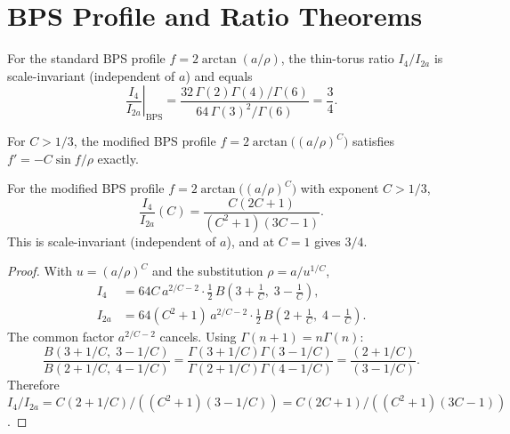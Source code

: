 

\section*{BPS Profile and Ratio Theorems}
\label{sec:bps}

\begin{proposition}
\label{P1:prop:bps}
For the standard BPS profile $f=2\arctan(a/\rho)$, the thin-torus ratio
$I_4/I_{2a}$ is scale-invariant (independent of $a$) and equals
\begin{equation}
  \left.\frac{I_4}{I_{2a}}\right|_{\mathrm{BPS}}
  = \frac{32\,\Gamma(2)\Gamma(4)/\Gamma(6)}
         {64\,\Gamma(3)^2/\Gamma(6)}
  = \frac{3}{4}.
  \label{P1:eq:bps_ratio}
\end{equation}
\end{proposition}

\begin{definition}
\label{P1:def:modified_bps}
For $C>1/3$, the modified BPS profile
$f = 2\arctan\!\bigl((a/\rho)^C\bigr)$
satisfies $f' = -C\sin f/\rho$ exactly.
\end{definition}

\begin{theorem}
\label{P1:thm:modBPS}
For the modified BPS profile $f = 2\arctan\!\bigl((a/\rho)^C\bigr)$
with exponent $C > 1/3$,
\begin{equation}
  \boxed{\frac{I_4}{I_{2a}}(C)
  = \frac{C(2C+1)}{(C^2+1)(3C-1)}.}
  \label{P1:eq:modBPS}
\end{equation}
This is scale-invariant (independent of $a$), and at $C=1$ gives $3/4$.
\end{theorem}
\begin{proof}
With $u=(a/\rho)^C$ and the substitution $\rho=a/u^{1/C}$,
\begin{align}
  I_4   &= 64C\,a^{2/C-2}\cdot\tfrac{1}{2}\,B\!\left(3+\tfrac{1}{C},\;3-\tfrac{1}{C}\right), \\
  I_{2a} &= 64(C^2+1)\,a^{2/C-2}\cdot\tfrac{1}{2}\,B\!\left(2+\tfrac{1}{C},\;4-\tfrac{1}{C}\right).
\end{align}
The common factor $a^{2/C-2}$ cancels.  Using $\Gamma(n+1)=n\Gamma(n)$:
\[
  \frac{B(3+1/C,\;3-1/C)}{B(2+1/C,\;4-1/C)}
  = \frac{\Gamma(3+1/C)\Gamma(3-1/C)}{\Gamma(2+1/C)\Gamma(4-1/C)}
  = \frac{(2+1/C)}{(3-1/C)}.
\]
Therefore $I_4/I_{2a} = C(2+1/C)/((C^2+1)(3-1/C)) = C(2C+1)/((C^2+1)(3C-1))$.
\end{proof}

